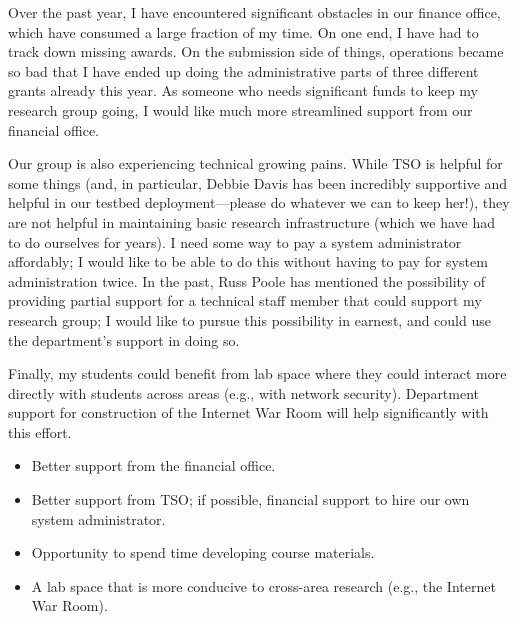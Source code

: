 \begin{sloppypar}
Over the past year, I have encountered significant obstacles in our
finance office, which have consumed a large fraction of my time.  On one
end, I have had to track down missing awards.  On the submission side of
things, operations became so bad that I have ended up doing the
administrative parts of three different grants already this year.  As
someone who needs significant funds to keep my research group going, I
would like much more streamlined support from our financial office.

Our group is also experiencing technical growing pains.  While TSO is
helpful for some things (and, in particular, Debbie Davis has been
incredibly supportive and helpful in our testbed deployment---please do
whatever we can to keep her!), they are not helpful in maintaining basic
research infrastructure (which we have had to do ourselves for years).
I need some way to pay a system administrator affordably; I would like
to be able to do this without having to pay for system administration
twice.  In the past, Russ Poole has mentioned the possibility of
providing partial support for a technical staff member that could
support my research group; I would like to pursue this possibility in
earnest, and could use the department's support in doing so.

Finally, my students could benefit from lab space where they could
interact more directly with students across areas (e.g., with network
security).  Department support for construction of the Internet War Room
will help significantly with this effort.


\begin{itemize}
\itemsep=-1pt
\item Better support from the financial office.
\item Better support from TSO; if possible, financial support to hire
our own system administrator.
\item Opportunity to spend time developing course materials.
\item A lab space that is more conducive to cross-area research (e.g.,
the Internet War Room).
\end{itemize}


\end{sloppypar}
